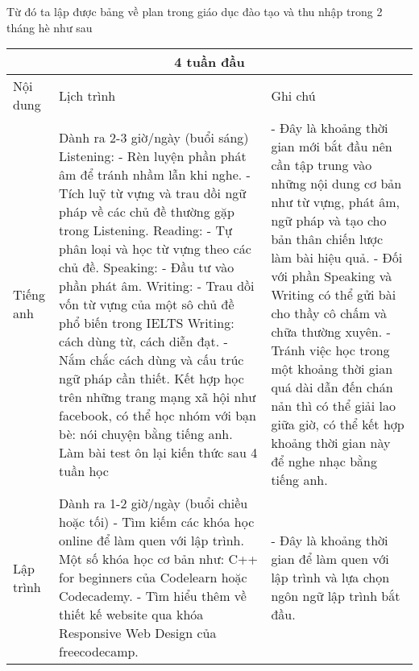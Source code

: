 Từ đó ta lập được bảng về plan trong giáo dục đào tạo và thu nhập trong 2 tháng hè như sau
\begin{center}
\begin{tabular}{ | m{2.5cm} | m{7.5cm}| m{7.5cm} |}
 \hline
 \multicolumn{3}{|c|}{4 tuần đầu} \\
 \hline
  Nội dung & Lịch trình & Ghi chú \\ 
\hline
 Tiếng anh & Dành ra 2-3 giờ/ngày (buổi sáng) \newline Listening: \newline - Rèn luyện phần phát âm để tránh nhầm lẫn khi nghe. \newline - Tích luỹ từ vựng và trau dồi ngữ pháp về các chủ đề thường gặp trong Listening. \newline Reading: \newline - Tự phân loại và học từ vựng theo các chủ đề. \newline Speaking: \newline - Đầu tư vào phần phát âm. \newline Writing: \newline - Trau dồi vốn từ vựng của một sô chủ đề phổ biến trong IELTS Writing: cách dùng từ, cách diễn đạt. \newline - Nắm chắc cách dùng và cấu trúc ngữ pháp cần thiết. \newline Kết hợp học trên những trang mạng xã hội như facebook, có thể học nhóm với bạn bè: nói chuyện bằng tiếng anh. \newline Làm bài test ôn lại kiến thức sau 4 tuần học& - Đây là khoảng thời gian mới bắt đầu nên cần tập trung vào những nội dung cơ bản như từ vựng, phát âm, ngữ pháp và tạo cho bản thân chiến lược làm bài hiệu quả. \newline - Đối với phần Speaking và Writing có thể gửi bài cho thầy cô chấm và chữa thường xuyên. \newline - Tránh việc học trong một khoảng thời gian quá dài dẫn đến chán nản thì có thể giải lao giữa giờ, có thể kết hợp khoảng thời gian này để nghe nhạc bằng tiếng anh. \\ 
 \hline
 Lập trình & Dành ra 1-2 giờ/ngày (buổi chiều hoặc tối) \newline - Tìm kiếm các khóa học online để làm quen với lập trình. Một số khóa học cơ bản như: C++ for beginners của Codelearn hoặc Codecademy. \newline - Tìm hiểu thêm về thiết kế website qua khóa Responsive Web Design của freecodecamp. & - Đây là khoảng thời gian để làm quen với lập trình và lựa chọn ngôn ngữ lập trình bắt đầu. \\ 

\end{tabular}
\end{center}
